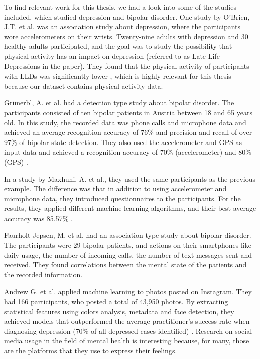 To find relevant work for this thesis, we had a look into some of the studies included, which studied depression and bipolar disorder. One study by O'Brien, J.T. et al. was an association study about depression, where the participants wore accelerometers on their wrists. Twenty-nine adults with depression and 30 healthy adults participated, and the goal was to study the possibility that physical activity has an impact on depression (referred to as Late Life Depressions in the paper). They found that the physical activity of participants with LLDs was significantly lower \cite{obrien_depression}, which is highly relevant for this thesis because our dataset contains physical activity data. 

Grünerbl, A. et al. had a detection type study about bipolar disorder. The participants consisted of ten bipolar patients in Austria between 18 and 65 years old. In this study, the recorded data was phone calls and microphone data and achieved an average recognition accuracy of 76\% and precision and recall of over 97\% of bipolar state detection. They also used the accelerometer and GPS as input data and achieved a recognition accuracy of 70\% (accelerometer) and 80\% (GPS) \cite{grunerbl_smartphone_bipolar}.

In a study by Maxhuni, A. et al., they used the same participants as the previous example. The difference was that in addition to using accelerometer and microphone data, they introduced questionnaires to the participants. For the results, they applied different machine learning algorithms, and their best average accuracy was 85.57\% \cite{maxhuni2016}.

Faurholt-Jepsen, M. et al. had an association type study about bipolar disorder. The participants were 29 bipolar patients, and actions on their smartphones like daily usage, the number of incoming calls, the number of text messages sent and received. They found correlations between the mental state of the patients and the recorded information. \cite{faurholt_smartphone_bipolar}

Andrew G. et al. applied machine learning to photos posted on Instagram. They had 166 participants, who posted a total of 43,950 photos. By extracting statistical features using colors analysis, metadata and face detection, they achieved models that outperformed the average practitioner's success rate when diagnosing depression (70\% of all depressed cases identified) \cite{instagram_depression}. Research on social media usage in the field of mental health is interesting because, for many, those are the platforms that they use to express their feelings. 


